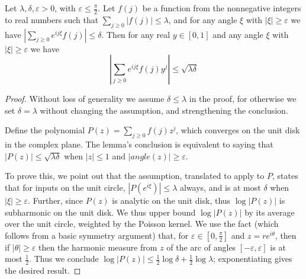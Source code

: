 \documentclass[11pt]{article}
\theoremstyle{plain}
\newcommand{\eps}{\varepsilon}
\begin{document}
\begin{lemma}\label{lem:sqrt-bound}
Let $\lambda,\delta,\eps> 0$, with $\eps\leq \frac{\pi}{2}$. Let $f(j)$ be a function from the nonnegative integers to real numbers such that $\sum_{j\geq 0} |f(j)|\leq \lambda$, and for any angle $\xi$ with $|\xi|\geq \eps$ we have $\left|\sum_{j\geq 0} e^{i j \xi} f(j)\right|\leq \delta$. Then for any real $y\in[0,1]$ and any angle $\xi$ with $|\xi|\geq \eps$ we have \[\left|\sum_{j\geq 0} e^{i j \xi} f(j) y^j\right|\leq \sqrt{\lambda\delta}\]
\end{lemma}
\begin{proof}
Without loss of generality we assume $\delta\leq \lambda$ in the proof, for otherwise we set $\delta=\lambda$ without changing the assumption, and strengthening the conclusion.

Define the polynomial $P(z)=\sum_{j\geq 0} f(j) z^j$, which converges on the unit disk in the complex plane. The lemma's conclusion is equivalent to saying that $|P(z)|\leq\sqrt{\lambda\delta}$ when $|z|\leq 1$ and $|angle(z)|\geq \eps$.

To prove this, we point out that the assumption, translated to apply to $P$, states that for inputs on the unit circle, $|P(e^{i \xi})|\leq \lambda$ always, and is at most $\delta$ when $|\xi|\geq\eps$. Further, since $P(z)$ is analytic on the unit disk, thus $\log|P(z)|$ is subharmonic on the unit disk. We thus upper bound $\log|P(z)|$ by its average over the unit circle, weighted by the Poisson kernel. We use the fact (which follows from a basic symmetry argument) that, for $\eps\in[0,\frac{\pi}{2}]$ and $z=re^{i\theta}$, then if $|\theta|\geq \eps$ then the harmonic measure from $z$ of the arc of angles $[-\eps,\eps]$ is at most $\frac{1}{2}$. 
Thus we conclude $\log|P(z)|\leq\frac{1}{2}\log\delta+\frac{1}{2}\log\lambda$; exponentiating gives the desired result.
\end{proof}
\end{document}
